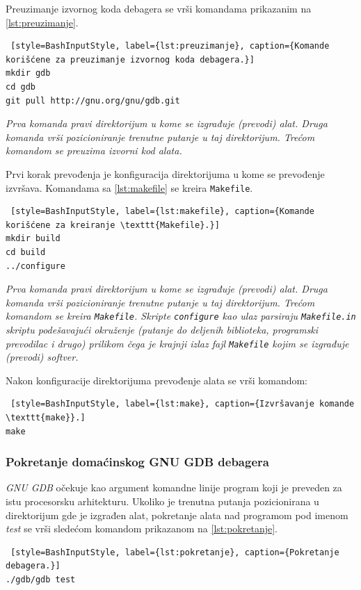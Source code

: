\documentclass[12pt,oneside]{memoir}
\begin{document}
Preuzimanje izvornog koda debagera se vrši komandama prikazanim na \ref{lst:preuzimanje}.
\begin{lstlisting} [style=BashInputStyle, label={lst:preuzimanje}, caption={Komande korišćene za preuzimanje izvornog koda debagera.}]
mkdir gdb
cd gdb
git pull http://gnu.org/gnu/gdb.git

\end{lstlisting}

\emph{ Prva komanda pravi direktorijum u kome se izgrađuje (prevodi) alat. Druga komanda vrši pozicioniranje trenutne putanje u taj direktorijum. Trećom komandom se preuzima izvorni kod alata.}\newpage

Prvi korak prevođenja je konfiguracija direktorijuma u kome se prevođenje izvršava. Komandama sa \ref{lst:makefile} se kreira \texttt{Makefile}.
\begin{lstlisting} [style=BashInputStyle, label={lst:makefile}, caption={Komande korišćene za kreiranje \texttt{Makefile}.}]
mkdir build
cd build
../configure

\end{lstlisting}
\emph{Prva komanda pravi direktorijum u kome se izgrađuje (prevodi) alat. Druga komanda vrši pozicioniranje trenutne putanje u taj direktorijum. Trećom komandom se kreira \texttt{Makefile}. Skripte \texttt{configure} kao ulaz parsiraju \texttt{Makefile.in} skriptu podešavajući okruženje (putanje do deljenih biblioteka, programski prevodilac i drugo) prilikom čega je krajnji izlaz fajl \texttt{Makefile} kojim se izgrađuje (prevodi) softver.}

Nakon konfiguracije direktorijuma prevođenje alata se vrši komandom:
\begin{lstlisting} [style=BashInputStyle, label={lst:make}, caption={Izvršavanje komande \texttt{make}}.]
make
\end{lstlisting}

\subsubsection{Pokretanje domaćinskog GNU GDB debagera}

\emph{GNU GDB} očekuje kao argument komandne linije program koji je preveden za istu procesorsku arhitekturu. Ukoliko je trenutna putanja pozicionirana u direktorijum gde je izgrađen alat, pokretanje alata nad programom pod imenom \emph{test} se vrši sledećom komandom prikazanom na \ref{lst:pokretanje}.
\begin{lstlisting} [style=BashInputStyle, label={lst:pokretanje}, caption={Pokretanje debagera.}]
./gdb/gdb test

\end{lstlisting}
\end{document}
